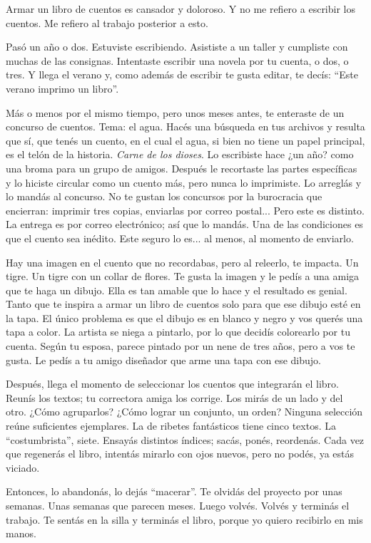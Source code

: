 \documentclass[11pt,twoside,openright]{book}
\begin{document}
\begin{em} Armar un libro de cuentos es cansador y doloroso. Y no me refiero a
escribir los cuentos. Me refiero al trabajo posterior a esto.

Pasó un año o dos. Estuviste escribiendo. Asististe a un taller y cumpliste con
muchas de las consignas. Intentaste escribir una novela por tu cuenta, o dos, o
tres. Y llega el verano y, como además de escribir te gusta editar, te decís:
“Este verano imprimo un libro”.

Más o menos por el mismo tiempo, pero unos meses antes, te enteraste de un
concurso de cuentos. Tema: el agua. Hacés una búsqueda en tus archivos y
resulta que sí, que tenés un cuento, en el cual el agua, si bien no tiene un
papel principal, es el telón de la historia. \emph{Carne de los dioses}. Lo
escribiste hace ¿un año? como una broma para un grupo de amigos. Después le
recortaste las partes específicas y lo hiciste circular como un cuento más,
pero nunca lo imprimiste. Lo arreglás y lo mandás al concurso. No te gustan los
concursos por la burocracia que encierran: imprimir tres copias, enviarlas por
correo postal... Pero este es distinto. La entrega es por correo electrónico;
así que lo mandás. Una de las condiciones es que el cuento sea inédito. Este
seguro lo es... al menos, al momento de enviarlo.

Hay una imagen en el cuento que no recordabas, pero al releerlo, te impacta. Un
tigre. Un tigre con un collar de flores. Te gusta la imagen y le pedís a una
amiga que te haga un dibujo. Ella es tan amable que lo hace y el resultado es
genial. Tanto que te inspira a armar un libro de cuentos solo para que ese
dibujo esté en la tapa. El único problema es que el dibujo es en blanco y negro
y vos querés una tapa a color. La artista se niega a pintarlo, por lo que
decidís colorearlo por tu cuenta. Según tu esposa, parece pintado por un nene
de tres años, pero a vos te gusta. Le pedís a tu amigo diseñador que arme una
tapa con ese dibujo.

Después, llega  el momento de seleccionar los cuentos que integrarán el libro.
Reunís los textos; tu correctora amiga los corrige. Los mirás de un lado y del
otro. ¿Cómo agruparlos? ¿Cómo lograr un conjunto, un orden? Ninguna selección
reúne suficientes ejemplares. La de ribetes fantásticos tiene cinco textos. La
“costumbrista”, siete. Ensayás distintos índices; sacás, ponés, reordenás. Cada
vez que regenerás el libro, intentás mirarlo con ojos nuevos, pero no podés, ya
estás viciado.

Entonces, lo abandonás, lo dejás “macerar”. Te olvidás del proyecto por unas
semanas. Unas semanas que parecen meses. Luego volvés. Volvés y terminás el
trabajo. Te sentás en la silla y terminás el libro, porque yo quiero recibirlo
en mis manos.

\end{em}
\end{document}

